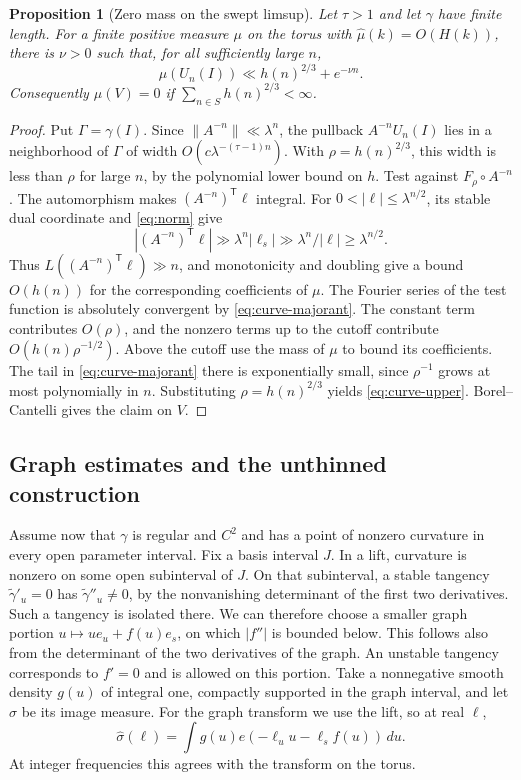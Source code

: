 \documentclass[11pt,a4paper,reqno]{amsart}
\newtheorem{proposition}[theorem]{Proposition}
\theoremstyle{definition}
\theoremstyle{remark}
\numberwithin{equation}{section}
\begin{document}
\begin{proposition}[Zero mass on the swept limsup]\label{prop:curve-upper}
Let \(\tau>1\) and let \(\gamma\) have finite length. For a finite
positive measure \(\mu\) on the torus with \(\widehat\mu(k)=O(H(k))\),
there is \(\nu>0\) such that, for all sufficiently large \(n\),
\begin{equation}\label{eq:curve-upper}
               \mu(U_n(I))\ll h(n)^{2/3}+e^{-\nu n}.
\end{equation}
Consequently \(\mu(V)=0\) if \(\sum_{n\in S}h(n)^{2/3}<\infty\).
\end{proposition}
\begin{proof}
Put \(\Gamma=\gamma(I)\). Since \(\|A^{-n}\|\ll\lambda^n\), the
pullback \(A^{-n}U_n(I)\) lies in a neighborhood of \(\Gamma\) of
width \(O(c\lambda^{-(\tau-1)n})\). With \(\rho=h(n)^{2/3}\), this
width is less than \(\rho\) for large \(n\), by the polynomial lower
bound on \(h\). Test against \(F_\rho\circ A^{-n}\).
The automorphism makes \((A^{-n})^{\mathsf T}\ell\) integral. For
\(0<|\ell|\le\lambda^{n/2}\), its stable dual coordinate and
\eqref{eq:norm} give
\[
  |(A^{-n})^{\mathsf T}\ell|
       \gg \lambda^n|\ell_s|
       \gg \lambda^n/|\ell|
       \ge \lambda^{n/2}.
\]
Thus \(L((A^{-n})^{\mathsf T}\ell)\gg n\), and monotonicity and doubling
give a bound \(O(h(n))\) for the corresponding coefficients of \(\mu\).
The Fourier series of the test function is absolutely convergent by
\eqref{eq:curve-majorant}. The constant term contributes \(O(\rho)\),
and the nonzero terms up to the cutoff contribute
\(O(h(n)\rho^{-1/2})\). Above the cutoff use the mass of \(\mu\) to
bound its coefficients. The tail in \eqref{eq:curve-majorant} there is
exponentially small, since \(\rho^{-1}\) grows at most polynomially in
\(n\). Substituting \(\rho=h(n)^{2/3}\) yields \eqref{eq:curve-upper}.
Borel--Cantelli gives the claim on \(V\).
\end{proof}

\subsection{Graph estimates and the unthinned construction}
Assume now that \(\gamma\) is regular and \(C^2\) and has a point of
nonzero curvature in every open parameter interval. Fix a basis
interval \(J\). In a lift, curvature is nonzero on some open subinterval
of \(J\). On that subinterval, a stable tangency
\(\widetilde\gamma'_u=0\) has \(\widetilde\gamma''_u\ne0\), by the
nonvanishing determinant of the first two derivatives. Such a tangency
is isolated there. We can therefore choose a smaller graph portion
\(u\mapsto u e_u+f(u)e_s\), on which \(|f''|\) is bounded below. This
follows also from the determinant of the two derivatives of the graph.
An unstable tangency corresponds to \(f'=0\) and is allowed on this
portion. Take a nonnegative smooth density \(g(u)\) of integral one,
compactly supported in the graph interval, and let \(\sigma\) be its
image measure. For the graph transform we use the lift, so at real
\(\ell\),
\[
 \widehat\sigma(\ell)=\int g(u)e(-\ell_u u-\ell_s f(u))\,du .
\]
At integer frequencies this agrees with the transform on the torus.
\end{document}
